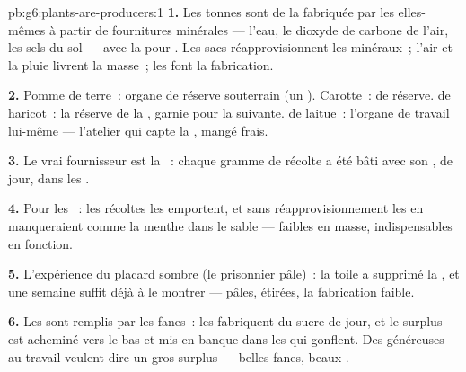 \begin{solution}{pb:g6:plants-are-producers:1}
\textbf{1.} Les tonnes sont de la  fabriquée par
les  elles-mêmes à partir de fournitures minérales --- l'eau,
le dioxyde de carbone de l'air, les sels du sol --- avec la 
pour . Les sacs réapprovisionnent les minéraux~; l'air et la
pluie livrent la masse~; les  font la fabrication.

\textbf{2.} Pomme de terre~: organe de réserve souterrain (un
). Carotte~:  de réserve.  de haricot~: la
réserve de la , garnie pour la  suivante.  de
laitue~: l'organe de travail lui-même --- l'atelier qui capte la
, mangé frais.

\textbf{3.} Le vrai fournisseur est la ~: chaque gramme de
récolte a été bâti avec son , de jour, dans les .

\textbf{4.} Pour les ~: les récoltes les emportent, et
sans réapprovisionnement les  en manqueraient comme la menthe
dans le sable --- faibles en masse, indispensables en fonction.

\textbf{5.} L'expérience du placard sombre (le prisonnier pâle)~: la
toile a supprimé la , et une semaine suffit déjà à le montrer
--- pâles, étirées, la fabrication faible.

\textbf{6.} Les  sont remplis par les fanes~: les 
fabriquent du sucre de jour, et le surplus est acheminé vers le bas
et mis en banque dans les  qui gonflent. Des 
généreuses au travail veulent dire un gros surplus --- belles fanes,
beaux .


\end{solution}
